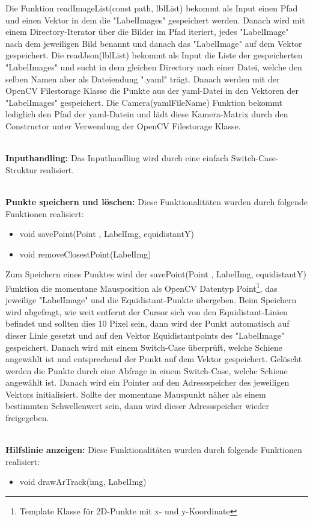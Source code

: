 \documentclass[11pt]{scrartcl}
\begin{document}
\noindent
Die Funktion readImageList(const path,  lblList) bekommt als Input einen Pfad und einen Vektor in dem die "LabelImages" gespeichert werden. Danach wird mit einem Directory-Iterator über die Bilder im Pfad iteriert, jedes "LabelImage" nach dem jeweiligen Bild benannt und danach das "LabelImage" auf dem Vektor gespeichert. Die readJson(lblList) bekommt als Input die Liste der gespeicherten "LabelImages" und sucht in dem gleichen Directory nach einer Datei, welche den selben Namen aber als Dateiendung ".yaml" trägt. Danach werden mit der OpenCV Filestorage Klasse die Punkte aus der yaml-Datei in den Vektoren der "LabelImages" gespeichert. Die Camera(yamlFileName) Funktion bekommt lediglich den Pfad der yaml-Datein und lädt diese Kamera-Matrix durch den Constructor unter Verwendung der OpenCV Filestorage Klasse.


\noindent
\\
\textbf{Inputhandling:}
\noindent
Das Inputhandling wird durch eine einfach Switch-Case-Struktur realisiert.

\noindent
\\
\textbf{Punkte speichern und löschen:}
\noindent
Diese Funktionalitäten wurden durch folgende Funktionen realisiert:
\begin{itemize}
	\item void savePoint(Point , LabelImg, equidistantY)
	\item void removeClosestPoint(LabelImg)
\end{itemize}

\noindent
Zum Speichern eines Punktes wird der savePoint(Point , LabelImg, equidistantY) Funktion die momentane Mausposition als OpenCV Datentyp Point\footnote{Template Klasse für 2D-Punkte mit x- und y-Koordinate}, das jeweilige "LabelImage" und die Equidistant-Punkte übergeben. Beim Speichern wird abgefragt, wie weit entfernt der Cursor sich von den Equidistant-Linien befindet und sollten dies 10 Pixel sein, dann wird der Punkt automatisch auf dieser Linie gesetzt und auf den Vektor Equidistantpoints des "LabelImage" gespeichert. Danach wird mit einem Switch-Case überprüft, welche Schiene angewählt ist und entsprechend der Punkt auf dem Vektor gespeichert. Gelöscht werden die Punkte durch eine Abfrage in einem Switch-Case, welche Schiene angewählt ist. Danach wird ein Pointer auf den Adressspeicher des jeweiligen Vektors initialisiert. Sollte der momentane Mauspunkt näher als einem bestimmten Schwellenwert sein, dann wird dieser Adressspeicher wieder freigegeben. 

\noindent
\\
\textbf{Hilfslinie anzeigen:}
\noindent
Diese Funktionalitäten wurden durch folgende Funktionen realisiert:
\begin{itemize}
	\item void drawArTrack(img, LabelImg)
\end{itemize}
\end{document}
